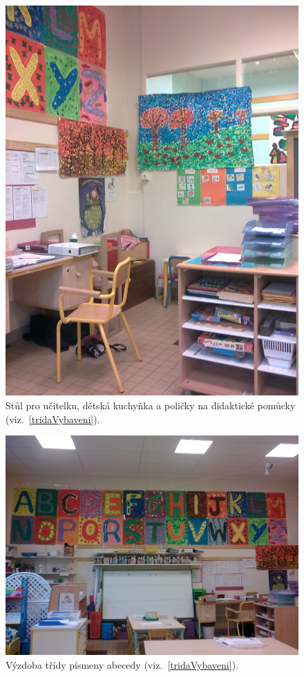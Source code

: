 	\begin{figure}[tb]
		\centering
		\includegraphics[height = 0.35\textheight]{./fotky/Obr5.jpg}
		\caption{
			Stůl pro učitelku, dětská kuchyňka a poličky na didaktické pomůcky (viz.~\ref{tridaVybaveni}).
		}
		\label{Obr5}
	\end{figure}

	\begin{figure}[tb]
		\centering
		\includegraphics[height = 0.35\textheight]{./fotky/Obr6.jpg}
		\caption{
			Výzdoba třídy písmeny abecedy (viz.~\ref{tridaVybaveni}).
		}
		\label{Obr6}
	\end{figure}


